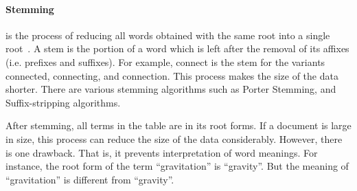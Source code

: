 \begin{table}
\centering
{}
\caption{Terms and Frequency After Stopwords Removal} \label{table:stopwordsremoval}
\end{table}

\paragraph{Stemming} is the process of reducing all words obtained with the same root into a single root~\cite[P. 20]{IRarchitecture}. 
A stem is the portion of a word which is left after
the removal of its affixes (i.e. prefixes and suffixes). For example, connect is the stem for the variants connected, connecting, and connection.
This process makes the size of the data shorter. There are various stemming algorithms such as Porter Stemming, and Suffix-stripping algorithms.

\begin{table}
\centering
{}
\caption{Terms and Frequency After Stemming} \label{table:stemming}
\end{table}
After stemming, all terms in the table are in its root forms. If a document is large in size, this process can reduce the size of the data considerably. However, 
there is one drawback. That is, it prevents interpretation of word meanings. For instance, the root form of the term ``gravitation'' is ``gravity''. But
the meaning of ``gravitation'' is different from ``gravity''.

